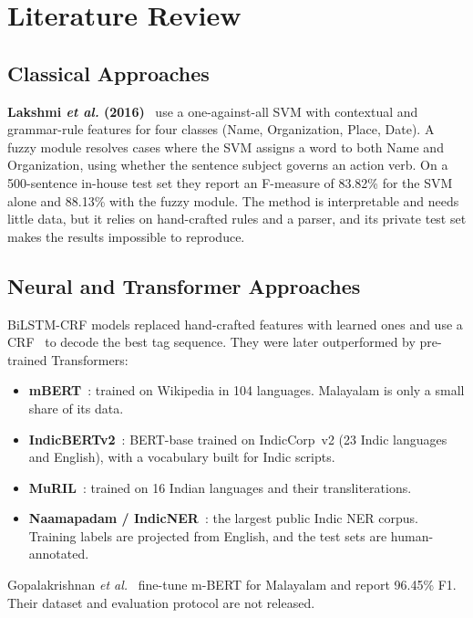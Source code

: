 \chapter{Literature Review}\label{ch:lit}

\section{Classical Approaches}

\textbf{Lakshmi \emph{et al.} (2016)}~\cite{lakshmi2016fuzzy} use a
one-against-all SVM with contextual and grammar-rule features for four
classes (Name, Organization, Place, Date). A fuzzy module resolves cases
where the SVM assigns a word to both Name and Organization, using whether
the sentence subject governs an action verb. On a 500-sentence in-house test
set they report an F-measure of 83.82\% for the SVM alone and 88.13\% with
the fuzzy module. The method is interpretable and needs little data, but it
relies on hand-crafted rules and a parser, and its private test set makes
the results impossible to reproduce.

\section{Neural and Transformer Approaches}

BiLSTM-CRF models replaced hand-crafted features with learned ones and use a
CRF~\cite{lafferty2001conditional} to decode the best tag sequence. They
were later outperformed by pre-trained Transformers:
\begin{itemize}
  \item \textbf{mBERT}~\cite{devlin2019bert}: trained on Wikipedia in 104
  languages. Malayalam is only a small share of its data.
  \item \textbf{IndicBERTv2}~\cite{doddapaneni2023towards}: BERT-base trained
  on IndicCorp~v2 (23 Indic languages and English), with a vocabulary built
  for Indic scripts.
  \item \textbf{MuRIL}~\cite{khanuja2021muril}: trained on 16 Indian
  languages and their transliterations.
  \item \textbf{Naamapadam / IndicNER}~\cite{mhaske2023naamapadam}: the
  largest public Indic NER corpus. Training labels are projected from
  English, and the test sets are human-annotated.
\end{itemize}
Gopalakrishnan \emph{et al.}~\cite{gopalakrishnan2025efficient} fine-tune
m-BERT for Malayalam and report 96.45\% F1. Their dataset and evaluation
protocol are not released.

